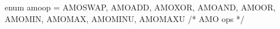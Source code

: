 enum amoop = {AMOSWAP, AMOADD, AMOXOR, AMOAND, AMOOR,
              AMOMIN, AMOMAX, AMOMINU, AMOMAXU}   /* AMO ops */
